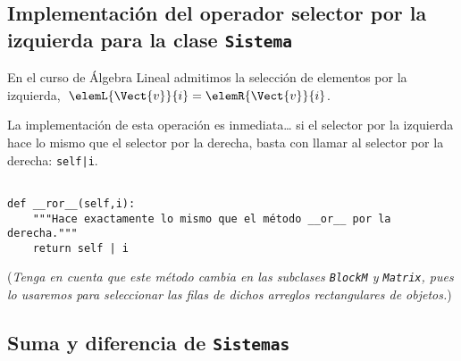 \documentclass[11pt]{report}
\begin{document}
\subsection{Implementación del operador selector por la izquierda para la clase \texttt{Sistema}}
\label{sec:org2f738cd}

En el curso de Álgebra Lineal admitimos la selección de elementos por
la izquierda, \(\;\elemL{\Vect{v}}{i}=\elemR{\Vect{v}}{i}\).

La implementación de esta operación es inmediata\dots{} si el selector
por la izquierda hace lo mismo que el selector por la derecha, basta
con llamar al selector por la derecha: \texttt{self|i}.

\begin{verbatim}

def __ror__(self,i):
    """Hace exactamente lo mismo que el método __or__ por la derecha."""
    return self | i

\end{verbatim}

(\emph{Tenga en cuenta que este método cambia en las subclases \texttt{BlockM} y \texttt{Matrix}, pues lo usaremos para seleccionar las filas de dichos arreglos rectangulares de objetos.})

\subsection{Suma y diferencia de \texttt{Sistemas}}
\label{sec:orgb3c4fc4}
\end{document}
